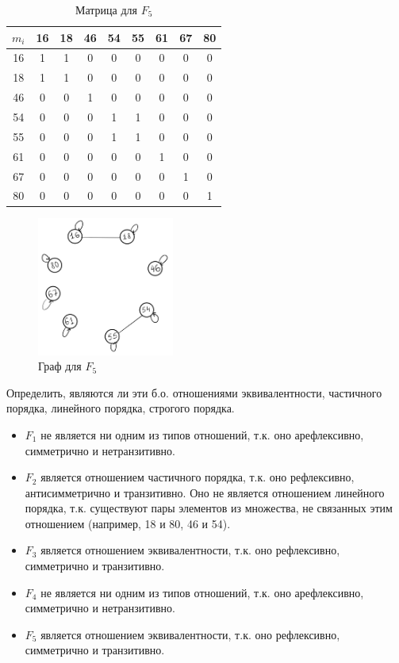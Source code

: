 \documentclass[a4paper, 14pt]{article}
\begin{document}
\begin{table}[h]
\centering
\begin{tabular}{|c|c|c|c|c|c|c|c|c|}
    \hline
    $m_i$ & 16 & 18 & 46 & 54 & 55 & 61 & 67 & 80 \\
    \hline
    16 & 1 & 1 & 0 & 0 & 0 & 0 & 0 & 0 \\
    \hline
    18 & 1 & 1 & 0 & 0 & 0 & 0 & 0 & 0 \\
    \hline
    46 & 0 & 0 & 1 & 0 & 0 & 0 & 0 & 0 \\
    \hline
    54 & 0 & 0 & 0 & 1 & 1 & 0 & 0 & 0 \\
    \hline
    55 & 0 & 0 & 0 & 1 & 1 & 0 & 0 & 0 \\
    \hline
    61 & 0 & 0 & 0 & 0 & 0 & 1 & 0 & 0 \\
    \hline
    67 & 0 & 0 & 0 & 0 & 0 & 0 & 1 & 0 \\
    \hline
    80 & 0 & 0 & 0 & 0 & 0 & 0 & 0 & 1 \\
    \hline
\end{tabular}
\caption{Матрица для $F_5$}
\label{Матрица:5}
\end{table}

\begin{figure}[h!]
    \centering
    \includegraphics[width=0.4\textwidth]{graph5.png}
    \caption{Граф для $F_5$}
    \label{Рисунок:5}
\end{figure}

\newpage

\begin{problem}
    Определить, являются ли эти б.о. отношениями эквивалентности, частичного порядка, линейного порядка, строгого порядка.
\end{problem}

\begin{itemize}
    \item $F_1$ не является ни одним из типов отношений, т.к. оно арефлексивно, симметрично и нетранзитивно.
    \item $F_2$ является отношением частичного порядка, т.к. оно рефлексивно, антисимметрично и транзитивно. Оно не является отношением линейного порядка, т.к. существуют пары элементов из множества, не связанных этим отношением (например, 18 и 80, 46 и 54).
    \item $F_3$ является отношением эквивалентности, т.к. оно рефлексивно, симметрично и транзитивно.
    \item $F_4$ не является ни одним из типов отношений, т.к. оно арефлексивно, симметрично и нетранзитивно.
    \item $F_5$ является отношением эквивалентности, т.к. оно рефлексивно, симметрично и транзитивно.
\end{itemize}
\end{document}
